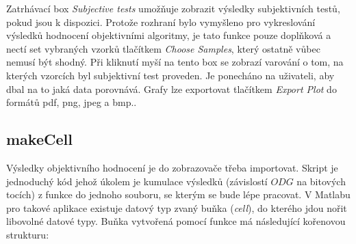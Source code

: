 Zatrhávací box \textit{Subjective tests} umožňuje zobrazit výsledky subjektivních testů, pokud jsou k dispozici. Protože rozhraní  bylo vymyšleno pro vykreslování výsledků hodnocení objektivními algoritmy, je tato funkce pouze doplňková a nectí set vybraných vzorků tlačítkem \textit{Choose Samples}, který ostatně vůbec nemusí být shodný.  Při kliknutí myší na tento box se zobrazí varování o tom, na kterých vzorcích byl subjektivní test proveden. Je ponecháno na uživateli, aby dbal na to jaká data porovnává. 
Grafy lze exportovat tlačítkem \textit{Export Plot} do formátů pdf, png, jpeg a bmp..

\subsection{makeCell}

Výsledky objektivního hodnocení je do zobrazovače  třeba importovat. Skript  je jednoduchý kód jehož úkolem je kumulace výsledků (závislostí $ODG$ na bitových tocích) z funkce  do jednoho souboru, se kterým se bude lépe pracovat. V Matlabu pro takové aplikace existuje datový typ zvaný buňka (\textit{cell}), do kterého jdou nořit libovolné datové typy. Buňka
vytvořená pomocí funkce  má následující kořenovou strukturu:

\centerline{}

